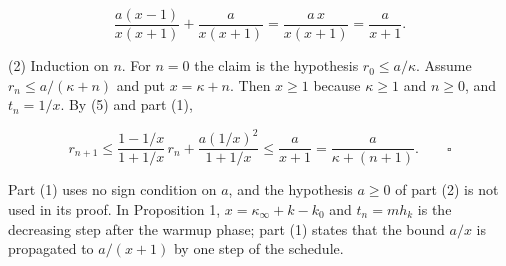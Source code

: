 \documentclass[11pt,a4paper]{article}
\begin{document}
\[\frac{a(x-1)}{x(x+1)}+\frac a{x(x+1)}=\frac{a\,x}{x(x+1)}=\frac a{x+1}.\]


(2) Induction on \(n\). For \(n=0\) the claim is the hypothesis \(r_0\le a/\kappa\). Assume \(r_n\le a/(\kappa+n)\) and put \(x=\kappa+n\). Then \(x\ge1\) because \(\kappa\ge1\) and \(n\ge0\), and \(t_n=1/x\). By (5) and part (1),


\[r_{n+1}\le\frac{1-1/x}{1+1/x}\,r_n+\frac{a(1/x)^2}{1+1/x}\le\frac a{x+1}=\frac a{\kappa+(n+1)}.\qquad\square\]


Part (1) uses no sign condition on \(a\), and the hypothesis \(a\ge0\) of part (2) is not used in its proof. In Proposition 1, \(x=\kappa_\infty+k-k_0\) and \(t_n=mh_k\) is the decreasing step after the warmup phase; part (1) states that the bound \(a/x\) is propagated to \(a/(x+1)\) by one step of the schedule.
\end{document}
